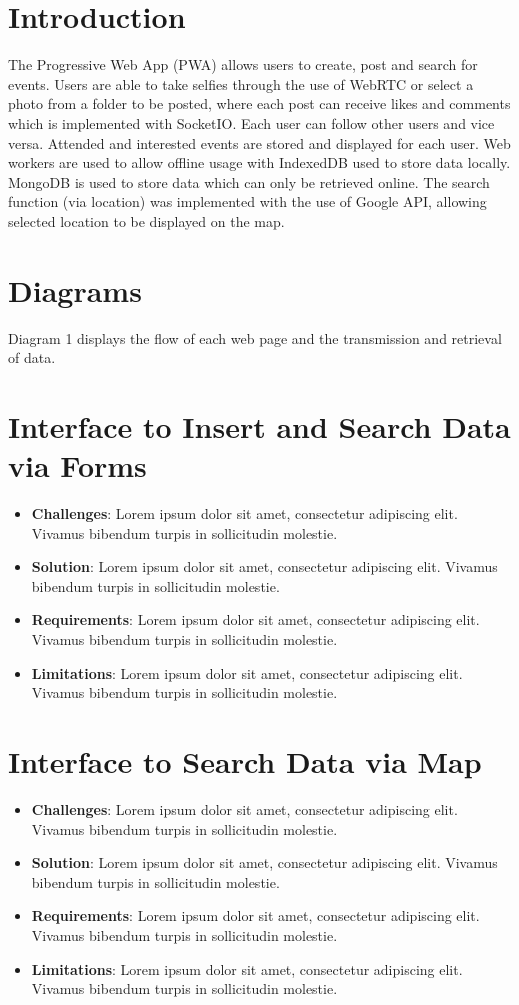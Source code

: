 \documentclass[11pt, a4paper]{article}
\begin{document}
\section{Introduction}
The Progressive Web App (PWA) allows users to create, post and search for events. Users are able to
take selfies through the use of WebRTC or select a photo from a folder to be posted, where each post
can receive likes and comments which is implemented with SocketIO. Each user can follow other users
and vice versa. Attended and interested events are stored and displayed for each user. Web workers
are used to allow offline usage with IndexedDB used to store data locally. MongoDB is used to store
data which can only be retrieved online. The search function (via location) was implemented with the
use of Google API, allowing selected location to be displayed on the map.

\section{Diagrams}
Diagram 1 displays the flow of each web page and the transmission and retrieval of data.

\section{Interface to Insert and Search Data via Forms}
\begin{itemize}
  \item \textbf{Challenges}: Lorem ipsum dolor sit amet, consectetur adipiscing elit. Vivamus
  bibendum turpis in sollicitudin molestie.
  \item \textbf{Solution}: Lorem ipsum dolor sit amet, consectetur adipiscing elit. Vivamus bibendum
  turpis in sollicitudin molestie.
  \item \textbf{Requirements}: Lorem ipsum dolor sit amet, consectetur adipiscing elit. Vivamus
  bibendum turpis in sollicitudin molestie.
  \item \textbf{Limitations}: Lorem ipsum dolor sit amet, consectetur adipiscing elit. Vivamus
  bibendum turpis in sollicitudin molestie.
\end{itemize}

\section{Interface to Search Data via Map}
\begin{itemize}
  \item \textbf{Challenges}: Lorem ipsum dolor sit amet, consectetur adipiscing elit. Vivamus
  bibendum turpis in sollicitudin molestie.
  \item \textbf{Solution}: Lorem ipsum dolor sit amet, consectetur adipiscing elit. Vivamus bibendum
  turpis in sollicitudin molestie.
  \item \textbf{Requirements}: Lorem ipsum dolor sit amet, consectetur adipiscing elit. Vivamus
  bibendum turpis in sollicitudin molestie.
  \item \textbf{Limitations}: Lorem ipsum dolor sit amet, consectetur adipiscing elit. Vivamus
  bibendum turpis in sollicitudin molestie.
\end{itemize}
\end{document}
